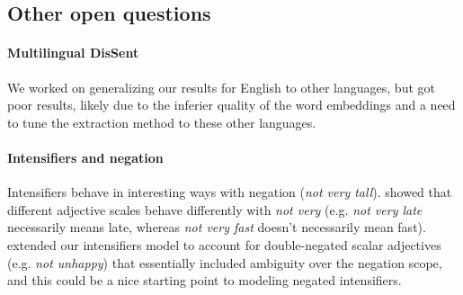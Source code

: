 \documentclass{article}
\newcommand{\w}[1]{\emph{#1}}
\begin{document}
\begin{appendices}


      \section{Other open questions}

      \paragraph{Multilingual DisSent} We worked on generalizing our results for English to other languages, but got poor results, likely due to the inferier quality of the word embeddings and a need to tune the extraction method to these other languages.

      \paragraph{Intensifiers and negation}

      Intensifiers behave in interesting ways with negation (\w{not very tall}).
       showed that different adjective scales behave differently with \w{not very} (e.g. \w{not very late} necessarily means late, whereas \w{not very fast} doesn't necessarily mean fast).
       extended our intensifiers model to account for double-negated scalar adjectives (e.g. \w{not unhappy}) that essentially included ambiguity over the negation scope, and this could be a nice starting point to modeling negated intensifiers.


\end{appendices}
\end{document}

